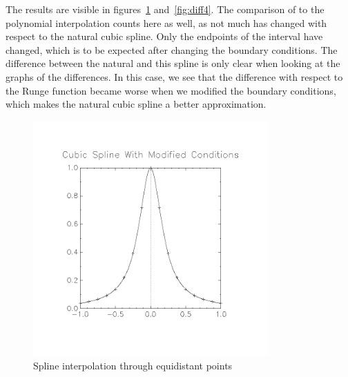 \documentclass[11pt, a4paper, titlepage, openright]{article}
\begin{document}
    \bigskip
    The results are visible in figures~\ref{fig:spline2} and~\ref{fig:diff4}. The comparison of to the polynomial
    interpolation counts here as well, as not much has changed with respect to the natural cubic spline. Only the
    endpoints of the interval have changed, which is to be expected after changing the boundary conditions.
    The difference between the natural and this spline is only clear when looking at the graphs of the differences.
    In this case, we see that the difference with respect to the Runge function became worse when we modified the
    boundary conditions, which makes the natural cubic spline a better approximation.
    \begin{figure}[H]
        \centering
        \includegraphics[width=9cm, trim={2cm, 4cm, 2cm, 3cm}, clip]{../images/spline2}
        \caption{Spline interpolation through equidistant points}
        \label{fig:spline2}
    \end{figure}
\end{document}
